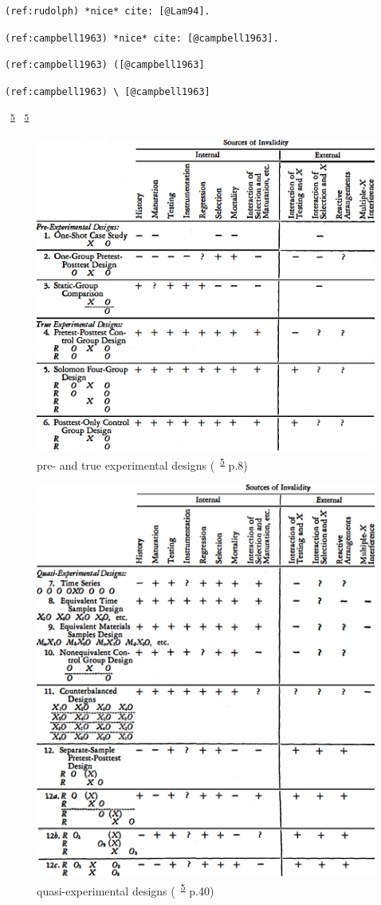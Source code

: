 \documentclass[
]{book}
\theoremstyle{definition}
\theoremstyle{definition}
\theoremstyle{definition}
\theoremstyle{definition}
\theoremstyle{remark}
\begin{document}
\texttt{(ref:rudolph)\ *nice*\ cite:\ {[}@Lam94{]}.}

\texttt{(ref:campbell1963)\ *nice*\ cite:\ {[}@campbell1963{]}.}

\texttt{(ref:campbell1963)\ ({[}@campbell1963{]}}

\texttt{(ref:campbell1963)\ \textbackslash{}\ {[}@campbell1963{]}}

~\textsuperscript{\protect\hyperlink{ref-campbell1963}{5}} ~\textsuperscript{\protect\hyperlink{ref-campbell1963}{5}}

\begin{figure}
\includegraphics[width=0.65\linewidth]{img/pre-and-true-experimental-designs} \caption{pre- and true experimental designs (~\textsuperscript{\protect\hyperlink{ref-campbell1963}{5}} p.8)}\label{fig:unnamed-chunk-1}
\end{figure}

\begin{figure}
\includegraphics[width=0.65\linewidth]{img/quasi-experimental-designs} \caption{quasi-experimental designs (~\textsuperscript{\protect\hyperlink{ref-campbell1963}{5}} p.40)}\label{fig:unnamed-chunk-2}
\end{figure}
\end{document}

